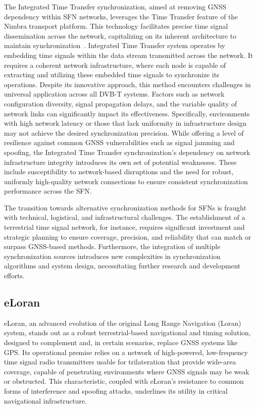 \documentclass[conference]{IEEEtran}
\begin{document}
The Integrated Time Transfer synchronization, aimed at removing GNSS dependency
within SFN networks, leverages the Time Transfer feature of the Nimbra
transport platform. This technology facilitates precise time signal
dissemination across the network, capitalizing on its inherent architecture to
maintain synchronization~\cite{Hellstrom2007}. Integrated Time Transfer system operates by
embedding time signals within the data stream transmitted across the network.
It requires a coherent network infrastructure, where each node is capable of
extracting and utilizing these embedded time signals to synchronize its
operations. Despite its innovative approach, this method encounters challenges
in universal application across all DVB-T systems. Factors such as network
configuration diversity, signal propagation delays, and the variable quality of
network links can significantly impact its effectiveness. Specifically,
environments with high network latency or those that lack uniformity in
infrastructure design may not achieve the desired synchronization precision.
While offering a level of resilience against common GNSS vulnerabilities such
as signal jamming and spoofing, the Integrated Time Transfer synchronization's
dependency on network infrastructure integrity introduces its own set of
potential weaknesses. These include susceptibility to network-based disruptions
and the need for robust, uniformly high-quality network connections to ensure
consistent synchronization performance across the SFN.

The transition towards alternative synchronization methods for SFNs is fraught
with technical, logistical, and infrastructural challenges. The establishment
of a terrestrial time signal network, for instance, requires significant
investment and strategic planning to ensure coverage, precision, and
reliability that can match or surpass GNSS-based methods. Furthermore, the
integration of multiple synchronization sources introduces new complexities in
synchronization algorithms and system design, necessitating further research
and development efforts.

\subsection{eLoran}\label{eloran-chap}

eLoran, an advanced evolution of the original Long Range Navigation (Loran)
system, stands out as a robust terrestrial-based navigational and timing
solution, designed to complement and, in certain scenarios, replace GNSS
systems like GPS. Its operational premise relies on a network of high-powered,
low-frequency time signal radio transmitters usable for trilateration that
provide wide-area coverage, capable of penetrating environments where GNSS
signals may be weak or obstructed. This characteristic, coupled with eLoran's
resistance to common forms of interference and spoofing attacks, underlines its
utility in critical navigational infrastructure.
\end{document}

